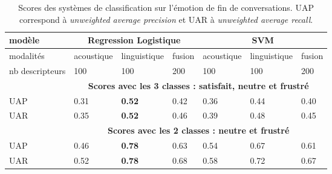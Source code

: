 \begin{table}[h]
  \centering
  \begin{tabular}{|l| l l l | l l l|}
    \hline
    modèle    &\multicolumn{3}{c|}{Regression Logistique} &\multicolumn{3}{c|}{SVM} \\
    \hline
    modalités    &acoustique  &linguistique  &fusion  &acoustique  &linguistique  &fusion\\
    nb descripteurs         & 100&100&200 & 100&100 &200\\
    \hline
    &\multicolumn{6}{c|}{\textbf{Scores avec les 3 classes : satisfait, neutre et frustré}}\\
    \hline
    UAP           &0.31  &\textbf{0.52}  & 0.42 &0.36 &0.44  &0.40 \\
    UAR              &0.35  &\textbf{0.52}  &0.46 &0.39  &0.48  & 0.45\\
    \hline
    &\multicolumn{6}{c|}{\textbf{Scores avec les 2 classes : neutre et frustré}}\\
    \hline
    UAP           &0.46 &\textbf{0.78} &0.63 &0.54 &0.67 &0.61 \\
    UAR              &0.52 &\textbf{0.78} &0.68 &0.58 &0.72 &0.67 \\
    \hline
  \end{tabular}
\caption{Scores des systèmes de classification sur l'émotion de fin de conversations. UAP correspond à \textit{unweighted average precision} et UAR à \textit{unweighted average recall}.}
\label{tab:resultClassifDiscrete}
\end{table}
